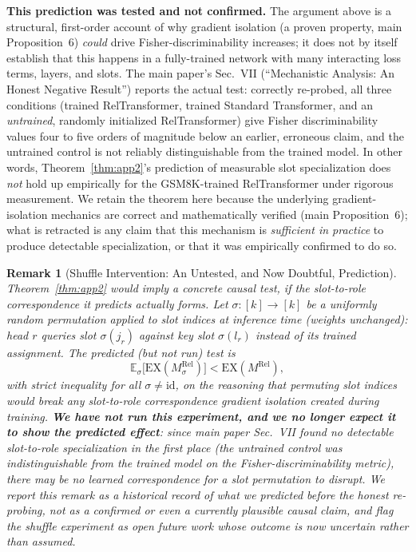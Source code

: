 \documentclass[conference]{IEEEtran}
\newtheorem{remark}{Remark}
\begin{document}
\textbf{This prediction was tested and not confirmed.} The argument above is a structural, first-order account of why gradient isolation (a proven property, main Proposition~6) \emph{could} drive Fisher-discriminability increases; it does not by itself establish that this happens in a fully-trained network with many interacting loss terms, layers, and slots. The main paper's Sec.~VII (``Mechanistic Analysis: An Honest Negative Result'') reports the actual test: correctly re-probed, all three conditions (trained RelTransformer, trained Standard Transformer, and an \emph{untrained}, randomly initialized RelTransformer) give Fisher discriminability values four to five orders of magnitude below an earlier, erroneous claim, and the untrained control is not reliably distinguishable from the trained model. In other words, Theorem~\ref{thm:app2}'s prediction of measurable slot specialization does \emph{not} hold up empirically for the GSM8K-trained RelTransformer under rigorous measurement. We retain the theorem here because the underlying gradient-isolation mechanics are correct and mathematically verified (main Proposition~6); what is retracted is any claim that this mechanism is \emph{sufficient in practice} to produce detectable specialization, or that it was empirically confirmed to do so.

\begin{remark}[Shuffle Intervention: An Untested, and Now Doubtful, Prediction]
\label{rem:shuffle}
Theorem~\ref{thm:app2} would imply a concrete causal test, \emph{if} the slot-to-role correspondence it predicts actually forms. Let $\sigma:[k]\to[k]$ be a uniformly random permutation applied to slot indices at inference time (weights unchanged): head $r$ queries slot $\sigma(j_r)$ against key slot $\sigma(l_r)$ instead of its trained assignment. The predicted (but not run) test is
\[
  \mathbb{E}_\sigma\bigl[\mathrm{EX}(M^{\mathrm{Rel}}_\sigma)\bigr] < \mathrm{EX}(M^{\mathrm{Rel}}),
\]
with strict inequality for all $\sigma \neq \mathrm{id}$, on the reasoning that permuting slot indices would break any slot-to-role correspondence gradient isolation created during training. \textbf{We have not run this experiment, and we no longer expect it to show the predicted effect}: since main paper Sec.~VII found no detectable slot-to-role specialization in the first place (the untrained control was indistinguishable from the trained model on the Fisher-discriminability metric), there may be no learned correspondence for a slot permutation to disrupt. We report this remark as a historical record of what we predicted before the honest re-probing, not as a confirmed or even a currently plausible causal claim, and flag the shuffle experiment as open future work whose outcome is now uncertain rather than assumed.
\end{remark}
\end{document}
